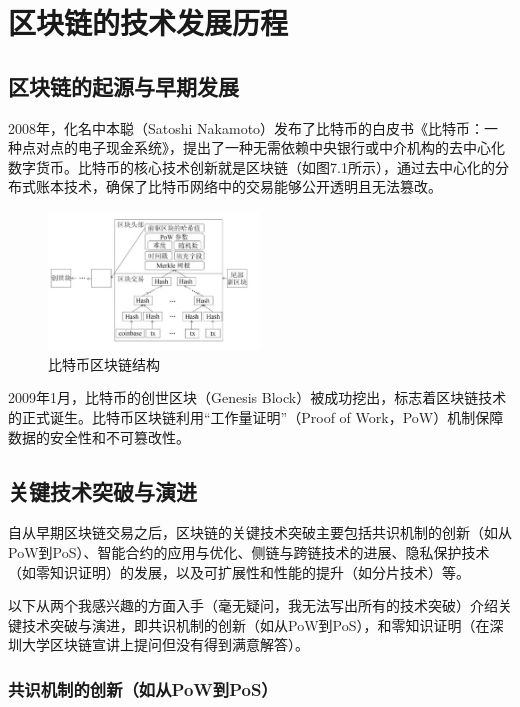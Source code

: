 \chapter{区块链的技术发展历程}

\section{区块链的起源与早期发展}

2008年，化名中本聪（Satoshi Nakamoto）发布了比特币的白皮书《比特币：一种点对点的电子现金系统》，提出了一种无需依赖中央银行或中介机构的去中心化数字货币。比特币的核心技术创新就是区块链（如图7.1所示），通过去中心化的分布式账本技术，确保了比特币网络中的交易能够公开透明且无法篡改。

\begin{figure}
	\centering
	\includegraphics[width=0.5\textwidth]{img/4.png}
	\caption{比特币区块链结构}
	\label{fig:example}
\end{figure}

2009年1月，比特币的创世区块（Genesis Block）被成功挖出，标志着区块链技术的正式诞生。比特币区块链利用“工作量证明”（Proof of Work，PoW）机制保障数据的安全性和不可篡改性。

\section{关键技术突破与演进}

自从早期区块链交易之后，区块链的关键技术突破主要包括共识机制的创新（如从PoW到PoS）、智能合约的应用与优化、侧链与跨链技术的进展、隐私保护技术（如零知识证明）的发展，以及可扩展性和性能的提升（如分片技术）等。

以下从两个我感兴趣的方面入手（毫无疑问，我无法写出所有的技术突破）介绍关键技术突破与演进，即共识机制的创新（如从PoW到PoS），和零知识证明（在深圳大学区块链宣讲上提问但没有得到满意解答）。

\subsection{共识机制的创新（如从PoW到PoS）}

